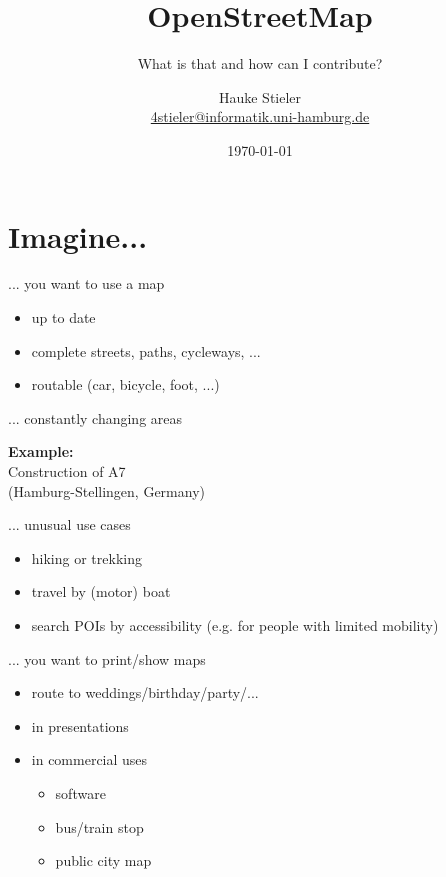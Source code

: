 \documentclass{beamer}
\title{OpenStreetMap}
\subtitle{What is that and how can I contribute?}
\author{Hauke Stieler\\\href{mailto:4stieler@informatik.uni-hamburg.de}{4stieler@informatik.uni-hamburg.de}}
\date{\today}
\begin{document}
	\maketitle
	
	\begin{frame}
		\tableofcontents[hideallsubsections]
	\end{frame}

	\section{Imagine...}
	
	\begin{frame}{... you want to use a map}
		\begin{itemize}
			\item up to date
			\item complete streets, paths, cycleways, ...
			\item routable (car, bicycle, foot, ...)
		\end{itemize}
	\end{frame}
	
	\begin{frame}{... constantly changing areas}
		\begin{center}
			\textbf{Example:}\\
			Construction of A7\\
			{\tiny (Hamburg-Stellingen, Germany)}
		\end{center}
	\end{frame}

	\begin{frame}{... unusual use cases}
		\begin{itemize}
			\item hiking or trekking
			\item travel by (motor) boat
			\item search POIs by accessibility (e.g. for people with limited mobility)
		\end{itemize}
	\end{frame}

	\begin{frame}{... you want to print/show maps}
		\begin{itemize}
			\item route to weddings/birthday/party/...
			\item in presentations
			\item in commercial uses
			\begin{itemize}
				\item software
				\item bus/train stop
				\item public city map
			\end{itemize}
		\end{itemize}
	\end{frame}
\end{document}
